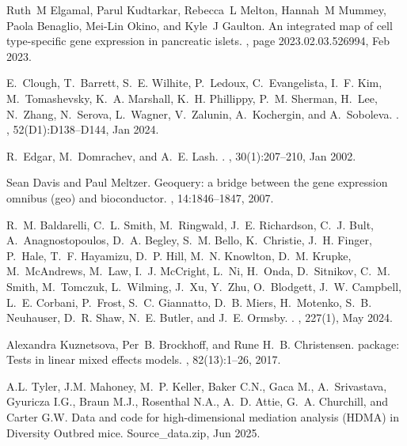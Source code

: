 \documentclass[
]{article}
\begin{document}
\begin{thebibliography}{100}
Ruth~M Elgamal, Parul Kudtarkar, Rebecca~L Melton, Hannah~M Mummey, Paola
  Benaglio, Mei-Lin Okino, and Kyle~J Gaulton.
\newblock An integrated map of cell type-specific gene expression in pancreatic
  islets.
, page 2023.02.03.526994, Feb 2023.

E.~Clough, T.~Barrett, S.~E. Wilhite, P.~Ledoux, C.~Evangelista, I.~F. Kim,
  M.~Tomashevsky, K.~A. Marshall, K.~H. Phillippy, P.~M. Sherman, H.~Lee,
  N.~Zhang, N.~Serova, L.~Wagner, V.~Zalunin, A.~Kochergin, and A.~Soboleva.
.
, 52(D1):D138--D144, Jan 2024.

R.~Edgar, M.~Domrachev, and A.~E. Lash.
.
, 30(1):207--210, Jan 2002.

Sean Davis and Paul Meltzer.
\newblock Geoquery: a bridge between the gene expression omnibus (geo) and
  bioconductor.
, 14:1846--1847, 2007.

R.~M. Baldarelli, C.~L. Smith, M.~Ringwald, J.~E. Richardson, C.~J. Bult,
  A.~Anagnostopoulos, D.~A. Begley, S.~M. Bello, K.~Christie, J.~H. Finger,
  P.~Hale, T.~F. Hayamizu, D.~P. Hill, M.~N. Knowlton, D.~M. Krupke,
  M.~McAndrews, M.~Law, I.~J. McCright, L.~Ni, H.~Onda, D.~Sitnikov, C.~M.
  Smith, M.~Tomczuk, L.~Wilming, J.~Xu, Y.~Zhu, O.~Blodgett, J.~W. Campbell,
  L.~E. Corbani, P.~Frost, S.~C. Giannatto, D.~B. Miers, H.~Motenko, S.~B.
  Neuhauser, D.~R. Shaw, N.~E. Butler, and J.~E. Ormsby.
.
, 227(1), May 2024.

Alexandra Kuznetsova, Per~B. Brockhoff, and Rune H.~B. Christensen.
 package: Tests in linear mixed effects models.
, 82(13):1--26, 2017.

A.L. Tyler, J.M. Mahoney, M.~P. Keller, Baker C.N., Gaca M., A.~Srivastava,
  Gyuricza I.G., Braun M.J., Rosenthal N.A., A.~D. Attie, G.~A. Churchill, and
  Carter G.W.
\newblock Data and code for high-dimensional mediation analysis (HDMA) in
  Diversity Outbred mice.
 Source\_data.zip, Jun 2025.

\end{thebibliography}
\end{document}
